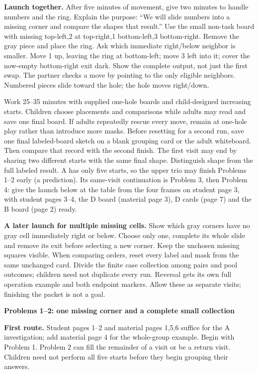 \documentclass[11pt]{article}
\newcommand{\heading}[1]{\par\textbf{#1}\par}
\begin{document}
\textbf{Launch together.} After five minutes of movement, give two minutes to handle numbers and the ring. Explain the purpose: ``We will slide numbers into a missing corner and compare the shapes that result.'' Use the small non-task board with missing top-left,2 at top-right,1 bottom-left,3 bottom-right. Remove the gray piece and place the ring. Ask which immediate right/below neighbor is smaller. Move 1 up, leaving the ring at bottom-left; move 3 left into it; cover the now-empty bottom-right exit dark. Show the complete output, not just the first swap. The partner checks a move by pointing to the only eligible neighbors. Numbered pieces slide toward the hole; the hole moves right/down.

Work 25--35 minutes with supplied one-hole boards and child-designed increasing starts. Children choose placements and comparisons while adults may read and save one final board. If adults repeatedly rescue every move, remain at one-hole play rather than introduce more masks. Before resetting for a second run, save one final labeled-board sketch on a blank grouping card or the adult whiteboard. Then compare that record with the second finish. The first visit may end by sharing two different starts with the same final shape. Distinguish shape from the full labeled result. A has only five starts, so the upper trio may finish Problems 1--2 early (a prediction). Its same-visit continuation is Problem 3, then Problem 4: give the launch below at the table from the four frames on student page 3, with student pages 3--4, the D board (material page 3), D cards (page 7) and the B board (page 2) ready.

\textbf{A later launch for multiple missing cells.} Show which gray corners have no gray cell immediately right or below. Choose only one, complete its whole slide and remove its exit before selecting a new corner. Keep the unchosen missing squares visible. When comparing orders, reset every label and mask from the same unchanged card. Divide the finite case collection among pairs and pool outcomes; children need not duplicate every run. Reversal gets its own full operation example and both endpoint markers. Allow these as separate visits; finishing the packet is not a goal.
\newpage
\heading{Problems 1--2: one missing corner and a complete small collection}
\textbf{First route.} Student pages 1--2 and material pages 1,5,6 suffice for the A investigation; add material page 4 for the whole-group example. Begin with Problem 1. Problem 2 can fill the remainder of a visit or be a return visit. Children need not perform all five starts before they begin grouping their answers.
\end{document}
